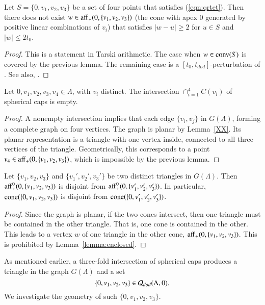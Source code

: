 \begin{lemma}\label{lemma:enclosed} 
Let $S=\{0,v_1,v_2,v_3\}$ be a set of four points
that satisfies (\ref{eqn:qrtet}).  Then
there does not exist $w\in{\operatorname{aff}}_+(0,\{v_1,v_2,v_3\})$
(the cone with apex $0$ 
generated by positive linear combinations of $v_i$) 
that satisfies $|w-u|\ge 2$ for 
$u\in S$ and $|w|\le 2t_0$.
\end{lemma}

\begin{proof} This is a statement in Tarski arithmetic.
The case when $w\in{\operatorname{conv}}(S)$ is covered by the previous lemma.
The remaining case is a $[t_0,t_{dod}]$-perturbation of
\cite[Lemma~4.19]{DCG}.  See also,  \cite[Cor~3.7]{arx}.
\end{proof}

\begin{lemma}  Let $0,v_1,v_2,v_3,v_4\in\Lambda$, with
$v_i$ distinct.  The intersection $\cap_{i=1}^4 C(v_i)$
of spherical caps is empty.
\end{lemma}

\begin{proof}  A nonempty intersection implies that each
edge $\{v_i,v_j\}$ in  $G(\Lambda)$, forming a complete graph
on four vertices.  The graph is planar by Lemma~\ref{XX}.
Its planar representation is a triangle with one vertex inside,
connected to all three vertices of the triangle.
Geometrically, this corresponds to a point $v_4\in{\operatorname{aff}}_+(0,\{v_1,v_2,v_3\})$, which is impossible by the previous lemma.
\end{proof}

\begin{lemma}  Let $\{v_1,v_2,v_3\}$ and $\{v_1',v_2',v_3'\}$
be two distinct triangles in $G(\Lambda)$.  Then
${\operatorname{aff}}_+^0(0,\{v_1,v_2,v_3\})$ is disjoint from
${\operatorname{aff}}_+^0(0,\{v_1',v_2',v_3'\})$.  In particular,
${\operatorname{cone}}(\{0,v_1,v_2,v_3\})$ is disjoint from
${\operatorname{cone}}(\{0,v_1',v_2',v_3'\})$.
\end{lemma}

\begin{proof} Since the graph is planar, if the two cones
intersect, then one triangle must be contained in the other
triangle.  That is, one cone is contained in the other.  This
leads to a vertex $w$ of one triangle in the other
cone, ${\operatorname{aff}}_+(0,\{v_1,v_2,v_3\})$.  This is prohibited
by Lemma~\ref{lemma:enclosed}.
\end{proof}

As mentioned earlier, a three-fold intersection of spherical
caps produces a triangle in the graph $G(\Lambda)$ and a 
set 
$$\{0,v_1,v_2,v_3\}\in {\mathcal Q}_{dod}(\Lambda,0).$$
We investigate the geometry of such $\{0,v_1,v_2,v_3\}$.

